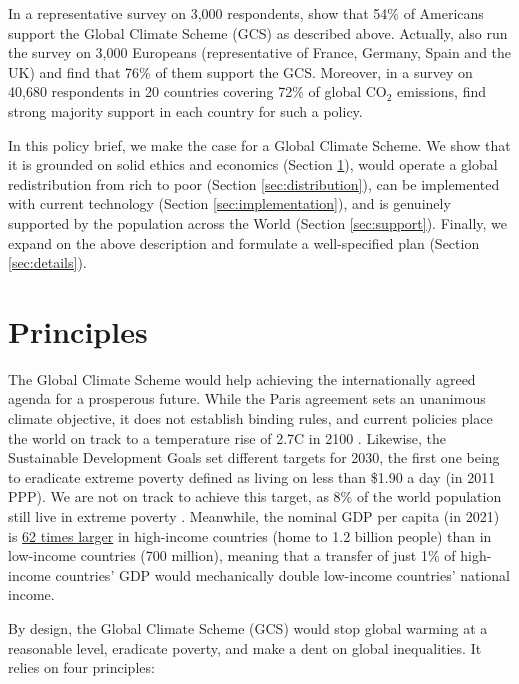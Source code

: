 \documentclass[12pt,english]{article}
\begin{document}
In a representative survey on 3,000 respondents, \citet{fabre_international_2023} show that 54\% of Americans support the Global Climate Scheme (GCS) as described above. Actually, \citet{fabre_international_2023} also run the survey on 3,000 Europeans (representative of France, Germany, Spain and the UK) and find that 76\% of them support the GCS. Moreover, in a survey on 40,680 respondents in 20 countries covering 72\% of global CO$_\text{2}$ emissions, \citet{dechezlepretre_fighting_2022} find strong majority support in each country for such a policy.

In this policy brief, we make the case for a Global Climate Scheme. We show that it is grounded on solid ethics and economics (Section \ref{sec:principles}), would operate a global redistribution from rich to poor (Section \ref{sec:distribution}), can be implemented with current technology (Section \ref{sec:implementation}), and is genuinely supported by the population across the World (Section \ref{sec:support}). Finally, we expand on the above description and formulate a well-specified plan (Section \ref{sec:details}).

\section{Principles}\label{sec:principles}
The Global Climate Scheme would help achieving the internationally agreed agenda for a prosperous future. While the Paris agreement sets an unanimous climate objective, it does not establish binding rules, and current policies place the world on track to a temperature rise of 2.7\textdegree{}C in 2100 \citep{climate_action_tracker_warming_2022}. Likewise, the Sustainable Development Goals set different targets for 2030, the first one being to eradicate extreme poverty defined as living on less than \$1.90 a day (in 2011 PPP). We are not on track to achieve this target, as 8\% of the world population still live in extreme poverty \citep{un_sustainable_2022}. Meanwhile, the nominal GDP per capita (in 2021) is \href{https://data.worldbank.org/indicator/NY.GDP.PCAP.CD?end=2021&locations=EU-ZG-XD-XM-1W-IN-US-CD-BI-LU-CN&start=2021&view=bar}{62 times larger} in high-income countries (home to 1.2 billion people) than in low-income countries (700 million), meaning that a transfer of just 1\% of high-income countries' GDP would mechanically double low-income countries' national income. 

By design, the Global Climate Scheme (GCS) would stop global warming at a reasonable level, eradicate poverty, and make a dent on global inequalities. It relies on four principles:
\end{document}

